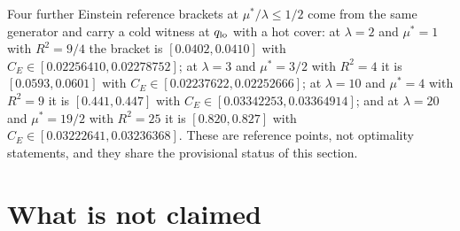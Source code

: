 \documentclass[11pt]{article}
\newcommand{\CE}{C_E}
\newcommand{\muS}{\mu^{*}}
\theoremstyle{definition}
\theoremstyle{remark}
\begin{document}
Four further Einstein reference brackets at $\muS/\lambda\le1/2$ come from the same
generator and carry a cold witness at $q_{\rm lo}$ with a hot cover: at $\lambda=2$ and
$\muS=1$ with $R^2=9/4$ the bracket is $[0.0402,0.0410]$ with
$\CE\in[0.02256410,0.02278752]$; at $\lambda=3$ and $\muS=3/2$ with $R^2=4$ it is
$[0.0593,0.0601]$ with $\CE\in[0.02237622,0.02252666]$; at $\lambda=10$ and $\muS=4$ with
$R^2=9$ it is $[0.441,0.447]$ with $\CE\in[0.03342253,0.03364914]$; and at $\lambda=20$ and
$\muS=19/2$ with $R^2=25$ it is $[0.820,0.827]$ with $\CE\in[0.03222641,0.03236368]$.
These are reference points, not optimality statements, and they share the provisional
status of this section.

\section{What is not claimed}\label{sec:not}
\end{document}
